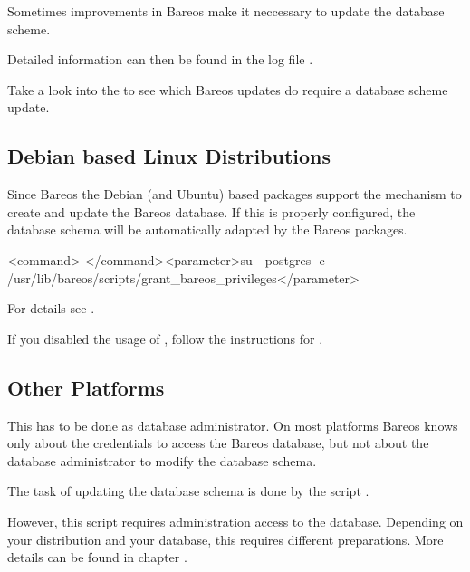 Sometimes improvements in Bareos make it neccessary to update the database scheme.


Detailed information can then be found in the log file \logfileUnix.

Take a look into the  to see which Bareos updates do require a database scheme update.


\subsection{Debian based Linux Distributions}

Since Bareos  the Debian (and Ubuntu) based packages support the  mechanism to create and update the Bareos database.
If this is properly configured, the database schema will be automatically adapted by the Bareos packages.

\begin{commands}{}
<command> </command><parameter>su - postgres -c /usr/lib/bareos/scripts/grant_bareos_privileges</parameter>
\end{commands}
For details see .

If you disabled the usage of , 
follow the instructions for .

\subsection{Other Platforms}
    \label{sec:UpdateDatabaseOtherDistributions}

This has to be done as database administrator.
On most platforms Bareos knows only about the credentials to access the Bareos database,
but not about the database administrator to modify the database schema.

The task of updating the database schema is done by the script
.

However, this script requires administration access to the database.
Depending on your distribution and your database, this requires different preparations.
More details can be found in chapter .

